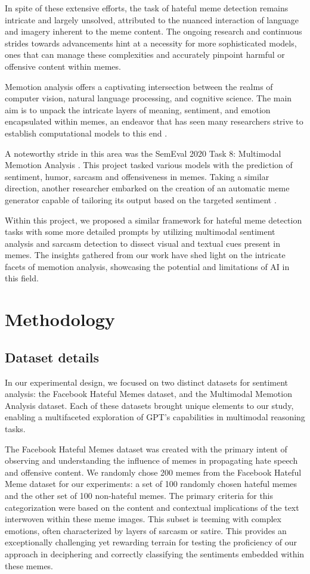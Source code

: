 \documentclass[conference]{IEEEtran}
\begin{document}
In spite of these extensive efforts, the task of hateful meme detection remains intricate and largely unsolved, attributed to the nuanced interaction of language and imagery inherent to the meme content. The ongoing research and continuous strides towards advancements hint at a necessity for more sophisticated models, ones that can manage these complexities and accurately pinpoint harmful or offensive content within memes.

Memotion analysis offers a captivating intersection between the realms of computer vision, natural language processing, and cognitive science. The main aim is to unpack the intricate layers of meaning, sentiment, and emotion encapsulated within memes, an endeavor that has seen many researchers strive to establish computational models to this end \cite{tanaka2022learning, scott2021memes}.

A noteworthy stride in this area was the SemEval 2020 Task 8: Multimodal Memotion Analysis \cite{sharma2020semeval}. This project tasked various models with the prediction of sentiment, humor, sarcasm and offensiveness in memes. Taking a similar direction, another researcher embarked on the creation of an automatic meme generator capable of tailoring its output based on the targeted sentiment \cite{pramanick2021momenta}.

Within this project, we proposed a similar framework for hateful meme detection tasks with some more detailed prompts by utilizing multimodal sentiment analysis and sarcasm detection to dissect visual and textual cues present in memes. The insights gathered from our work have shed light on the intricate facets of memotion analysis, showcasing the potential and limitations of AI in this field.

\section{Methodology}
\subsection{Dataset details}
 In our experimental design, we focused on two distinct datasets for sentiment analysis: the Facebook Hateful Memes dataset, and the Multimodal Memotion Analysis dataset. Each of these datasets brought unique elements to our study, enabling a multifaceted exploration of GPT's capabilities in multimodal reasoning tasks.

The Facebook Hateful Memes dataset was created with the primary intent of observing and understanding the influence of memes in propagating hate speech and offensive content. We randomly chose 200 memes from the Facebook Hateful Meme dataset for our experiments: a set of 100 randomly chosen hateful memes and the other set of 100 non-hateful memes. The primary criteria for this categorization were based on the content and contextual implications of the text interwoven within these meme images. This subset is teeming with complex emotions, often characterized by layers of sarcasm or satire. This provides an exceptionally challenging yet rewarding terrain for testing the proficiency of our approach in deciphering and correctly classifying the sentiments embedded within these memes.
\end{document}
